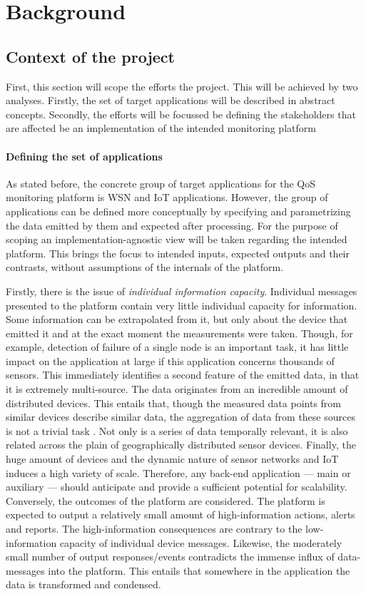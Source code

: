 \chapter{Background}
\label{ch:back}
\section{Context of the project}
\label{sec:back:context}
First, this section will scope the efforts the project. This will be achieved by two analyses. Firstly, the set of target applications will be described in abstract concepts. Secondly, the efforts will be focussed  be defining the stakeholders that are affected be an implementation of the intended monitoring platform

\subsubsection*{Defining the set of applications}
As stated before, the concrete group of target applications for the QoS monitoring platform is WSN and IoT applications. However, the group of applications can be defined more conceptually by specifying and parametrizing the data emitted by them and expected after processing. For the purpose of scoping an implementation-agnostic view will be taken regarding the intended platform. This brings the focus to intended inputs, expected outputs and their contrasts, without assumptions of the internals of the platform.

Firstly, there is the issue of \emph{individual information capacity}. Individual messages presented to the platform contain very little individual capacity for information. Some information can be extrapolated from it, but only about the device that emitted it and at the exact moment the measurements were taken. Though, for example, detection of failure of a single node is an important task, it has little impact on the application at large if this application concerns thousands of sensors. This immediately identifies a second feature of the emitted data, in that it is extremely multi-source. The data originates from an incredible amount of distributed devices. This entails that, though the measured data points from similar devices describe similar data, the aggregation of data from these sources is not a trivial task \cite{iot_big_data_difficulties}. Not only is a series of data temporally relevant, it is also related across the plain of geographically distributed sensor devices. Finally, the huge amount of devices and the dynamic nature of sensor networks and IoT induces a high variety of scale. Therefore, any back-end application --- main or auxiliary --- should anticipate and provide a sufficient potential for scalability. Conversely, the outcomes of the platform are considered. The platform is expected to output a relatively small amount of high-information actions, alerts and reports. The high-information consequences are contrary to the low-information capacity of individual device messages. Likewise, the moderately small number of output responses/events contradicts the immense influx of data-messages into the platform. This entails that somewhere in the application the data is transformed and condensed.

